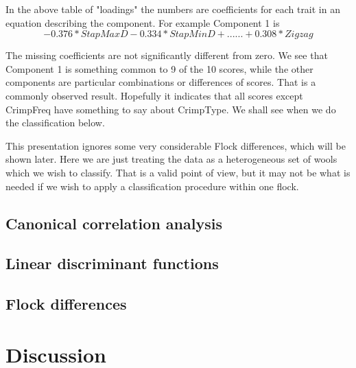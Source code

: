 \documentclass[titlepage]{article}  %
\begin{document}
 In the above table of "loadings" the numbers are coefficients for each trait in an equation describing the component. For example Component 1 is
\begin{displaymath}
-0.376 * StapMaxD - 0.334 * StapMinD + ...... + 0.308 * Zigzag
\end{displaymath}	

The missing coefficients are not significantly different from zero.
We see that Component 1 is something common to 9 of the 10 scores, while the other components are particular combinations or differences of scores. That is a commonly observed result. Hopefully it indicates that all scores except CrimpFreq have something to say about CrimpType. We shall see when we do the classification below.

This presentation ignores some very considerable Flock differences, which will be shown later. Here we are just treating the data as a heterogeneous set of wools which we wish to classify.  That is a valid point of view, but it may not be what is needed if we wish to apply a classification procedure within one flock.

\subsection{Canonical correlation analysis}

\subsection{Linear discriminant functions}

\subsection{Flock differences}

\section{Discussion}

 
\end{document}
